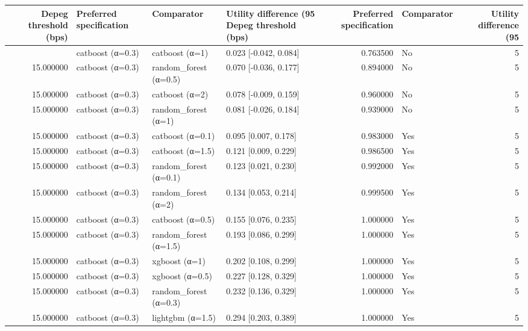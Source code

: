 \begin{longtable}{rlllrlr}
\toprule
Depeg threshold (bps) & Preferred specification & Comparator & Utility difference (95%
\midrule
\endfirsthead
\toprule
Depeg threshold (bps) & Preferred specification & Comparator & Utility difference (95%
\midrule
\endhead
\midrule
\multicolumn{7}{r}{Continued on next page} \\
\midrule
\endfoot
\bottomrule
\endlastfoot
15.000000 & catboost (α=0.3) & catboost (α=1) & 0.023 [-0.042, 0.084] & 0.763500 & No & 5 \\
15.000000 & catboost (α=0.3) & random_forest (α=0.5) & 0.070 [-0.036, 0.177] & 0.894000 & No & 5 \\
15.000000 & catboost (α=0.3) & catboost (α=2) & 0.078 [-0.009, 0.159] & 0.960000 & No & 5 \\
15.000000 & catboost (α=0.3) & random_forest (α=1) & 0.081 [-0.026, 0.184] & 0.939000 & No & 5 \\
15.000000 & catboost (α=0.3) & catboost (α=0.1) & 0.095 [0.007, 0.178] & 0.983000 & Yes & 5 \\
15.000000 & catboost (α=0.3) & catboost (α=1.5) & 0.121 [0.009, 0.229] & 0.986500 & Yes & 5 \\
15.000000 & catboost (α=0.3) & random_forest (α=0.1) & 0.123 [0.021, 0.230] & 0.992000 & Yes & 5 \\
15.000000 & catboost (α=0.3) & random_forest (α=2) & 0.134 [0.053, 0.214] & 0.999500 & Yes & 5 \\
15.000000 & catboost (α=0.3) & catboost (α=0.5) & 0.155 [0.076, 0.235] & 1.000000 & Yes & 5 \\
15.000000 & catboost (α=0.3) & random_forest (α=1.5) & 0.193 [0.086, 0.299] & 1.000000 & Yes & 5 \\
15.000000 & catboost (α=0.3) & xgboost (α=1) & 0.202 [0.108, 0.299] & 1.000000 & Yes & 5 \\
15.000000 & catboost (α=0.3) & xgboost (α=0.5) & 0.227 [0.128, 0.329] & 1.000000 & Yes & 5 \\
15.000000 & catboost (α=0.3) & random_forest (α=0.3) & 0.232 [0.136, 0.329] & 1.000000 & Yes & 5 \\
15.000000 & catboost (α=0.3) & lightgbm (α=1.5) & 0.294 [0.203, 0.389] & 1.000000 & Yes & 5 \\

\end{longtable}

